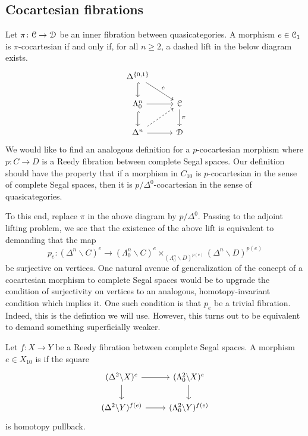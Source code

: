 \documentclass[main.tex]{subfiles}
\begin{document}
\subsection{Cocartesian fibrations}
\label{ssc:cocartesian_fibrations}

Let $\pi\colon \mathcal{C} \to \mathcal{D}$ be an inner fibration between quasicategories. A morphism $e \in \mathcal{C}_{1}$ is $\pi$-cocartesian if and only if, for all $n \geq 2$, a dashed lift in the below diagram exists.
\begin{equation*}
  \begin{tikzcd}
    \Delta^{\{0, 1\}}
    \arrow[d, hook]
    \arrow[dr, "e"]
    \\
    \Lambda^{n}_{0}
    \arrow[r]
    \arrow[d, hook]
    & \category{C}
    \arrow[d, "\pi"]
    \\
    \Delta^{n}
    \arrow[r]
    \arrow[ur, dashed]
    & \category{D}
  \end{tikzcd}
\end{equation*}
We would like to find an analogous definition for a $p$-cocartesian morphism where $p\colon C \to D$ is a Reedy fibration between complete Segal spaces. Our definition should have the property that if a morphism in $C_{10}$ is $p$-cocartesian in the sense of complete Segal spaces, then it is $p / \Delta^{0}$-cocartesian in the sense of quasicategories.

To this end, replace $\pi$ in the above diagram by $p / \Delta^{0}$. Passing to the adjoint lifting problem, we see that the existence of the above lift is equivalent to demanding that the map
\begin{equation}
  p_{e}\colon (\Delta^{n} \backslash C)^{e} \to (\Lambda^{n}_{0} \backslash C)^{e} \times_{(\Lambda^{n}_{0} \backslash D)^{p(e)}} (\Delta^{n} \backslash D)^{p(e)}
\end{equation}
be surjective on vertices. One natural avenue of generalization of the concept of a cocartesian morphism to complete Segal spaces would be to upgrade the condition of surjectivity on vertices to an analogous, homotopy-invariant condition which implies it. One such condition is that $p_{e}$ be a trivial fibration. Indeed, this is the defintion we will use. However, this turns out to be equivalent to demand something superficially weaker.

\begin{definition}
  \label{def:cocartesian_morphism}
  Let $f\colon X \to Y$ be a Reedy fibration between complete Segal spaces. A morphism $e \in X_{10}$ is  if the square
  \begin{equation*}
    \begin{tikzcd}
      (\Delta^{2} \backslash X)^{e}
      \arrow[r]
      \arrow[d]
      & (\Lambda^{2}_{0} \backslash X)^{e}
      \arrow[d]
      \\
      (\Delta^{2} \backslash Y)^{f(e)}
      \arrow[r]
      & (\Lambda^{2}_{0} \backslash Y)^{f(e)}
    \end{tikzcd}
  \end{equation*}
  is homotopy pullback.
\end{definition}
\end{document}
